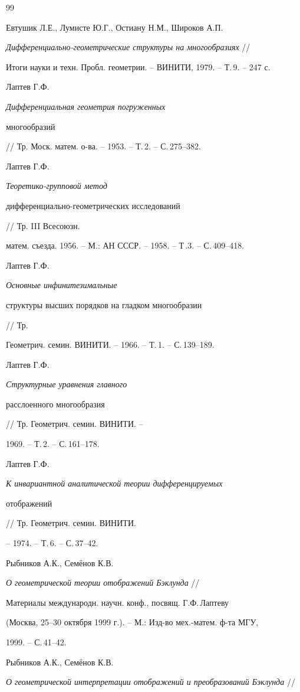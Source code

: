 \begin{thebibliography}{99}





 Евтушик Л.Е., Лумисте Ю.Г., Остиану Н.М., Широков А.П.


{\it Дифференциально-геометрические структуры на многообразиях} //


Итоги науки и техн. Пробл. геометрии. -- ВИНИТИ, 1979. -- Т.\,9. -- 247 с.


 Лаптев Г.Ф. {\it Дифференциальная геометрия погруженных 


многообразий} // Тр. Моск. матем. о-ва. -- 1953. -- Т.\,2. -- С.\,275--382.


 Лаптев Г.Ф. {\it Теоретико-групповой метод 


дифференциально-геометрических исследований} // Тр. III Всесоюзн. 


матем. съезда. 1956. -- М.: АН СССР. -- 1958. -- Т\,.3. -- С.\,409--418.


 Лаптев Г.Ф. {\it Основные инфинитезимальные 


структуры высших порядков на гладком многообразии} // Тр. 


Геометрич. семин. ВИНИТИ. -- 1966. -- Т.\,1. -- С.\,139--189.


 Лаптев Г.Ф. {\it Структурные уравнения главного 


расслоенного многообразия} // Тр. Геометрич. семин. ВИНИТИ. -- 


1969. -- Т.\,2. -- С.\,161--178.


 Лаптев Г.Ф. {\it К инвариантной аналитической теории дифференцируемых 


отображений} // Тр. Геометрич. семин. ВИНИТИ.


-- 1974. -- Т.\,6. -- С.\,37--42.


 Рыбников А.К., Сем\"енов К.В. 


{\it О геометрической теории отображений Бэклунда} // 


Материалы международн. научн. конф., посвящ. Г.Ф.\,Лаптеву


(Москва, 25--30 октября 1999 г.). -- М.: Изд-во мех.-матем. ф-та МГУ, 


1999. -- С.\,41--42.


 Рыбников А.К., Сем\"енов К.В. 


{\it О геометрической интерпретации отображений и преобразований Бэклунда} // 



\end{thebibliography}
